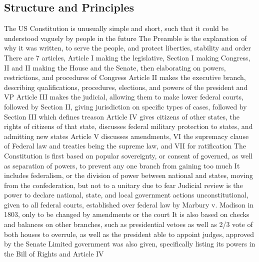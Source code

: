 \documentclass[11 pt, twoside]{article}
\newenvironment{outline*}
{
	\begin{outline}[enumerate]
	}
	{\end{outline}
}
\begin{document}
\subsection{Structure and Principles}
\begin{outline*}
\1 The US Constitution is unusually simple and short, such that it could be understood vaguely by people in the future
\2 The Preamble is the explanation of why it was written, to serve the people, and protect liberties, stability and order
\2 There are 7 articles, Article I making the legislative, Section I making Congress, II and II making the House and the Senate, then elaborating on powers, restrictions, and procedures of Congress
\2 Article II makes the executive branch, describing qualifications, procedures, elections, and powers of the president and VP
\2 Article III makes the judicial, allowing them to make lower federal courts, followed by Section II, giving jurisdiction on specific types of cases, followed by Section III which defines treason
\2 Article IV gives citizens of other states, the rights of citizens of that state, discusses federal military protection to states, and admitting new states
\2 Article V discusses amendments, VI the supremacy clause of Federal law and treaties being the supreme law, and VII for ratification
\1 The Constitution is first based on popular sovereignty, or consent of governed, as well as separation of powers, to prevent any one branch from gaining too much
\2 It includes federalism, or the division of power between national and states, moving from the confederation, but not to a unitary due to fear
\1 Judicial review is the power to declare national, state, and local government actions unconstitutional, given to all federal courts, established over federal law by Marbury v. Madison in 1803, only to be changed by amendments or the court
\2 It is also based on checks and balances on other branches, such as presidential vetoes as well as 2/3 vote of both houses to overrule, as well as the president able to appoint judges, approved by the Senate
\2 Limited government was also given, specifically listing its powers in the Bill of Rights and Article IV
\end{outline*}
\end{document}
